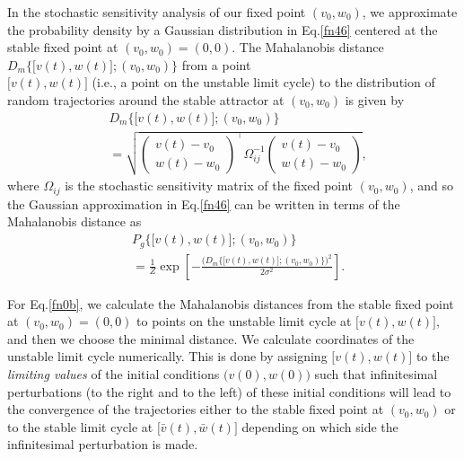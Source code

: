 In the stochastic sensitivity analysis of our fixed point
$(v_0,w_0)$, we approximate the probability density by a Gaussian
distribution in Eq.\eqref{fn46} centered at the stable fixed point at
$(v_0,w_0)=(0,0)$. The Mahalanobis distance
$D_m\Big\{\big[v(t),w(t)\big];(v_0,w_0)\Big\}$ from a point\\
$\big[v(t),w(t)\big]$ (i.e., a point on the unstable limit cycle) to
the distribution of random trajectories around the stable
attractor at $(v_0,w_0)$ is given by
\begin{align}\label{fn51}\nonumber
&D_m\Big\{\big[v(t),w(t)\big];(v_0,w_0)\Big\}\\
&=\sqrt{\left(\begin{array}{c}
 v(t)-v_0\\w(t)-w_0
\end{array}\right)^{\top}\Omega_{ij}^{-1}\left(\begin{array}{c}
 v(t)-v_0\\w(t)-w_0
\end{array}\right)},
\end{align}
where $\Omega_{ij}$ is the stochastic sensitivity matrix of
the fixed point $(v_0,w_0)$, and so the Gaussian approximation in
Eq.\eqref{fn46} can be written in terms of the
Mahalanobis distance as
\begin{align}\label{fn52}\nonumber
&P_g\Big\{\big[v(t),w(t)\big];(v_0,w_0)\Big\}\\  
&=\frac{1}{Z}\exp\left[-\frac{\bigg(D_m\Big\{\big[v(t),
w(t)\big];(v_0,w_0)\Big\}\bigg)^2}{2\sigma^2}\right].
\end{align}

For Eq.\eqref{fn0b}, we calculate the
Mahalanobis distances from the stable fixed point at $(v_0,w_0)=(0,0)$
to points on the unstable limit cycle at $\big[v(t),w(t)\big]$, and
then we choose the minimal distance. We calculate coordinates of
the unstable limit cycle numerically. This is done by assigning
$\big[v(t),w(t)\big]$ to the \textit{limiting values} of the initial
conditions $\big(v(0),w(0)\big)$ such that infinitesimal
perturbations (to the right and to the left) of these initial
conditions will lead to the convergence of the trajectories either
to the stable fixed point at $(v_0,w_0)$ or to the stable limit
cycle at $\big[\bar{v}(t),\bar{w}(t)\big]$ depending on which side
the infinitesimal perturbation is made.

